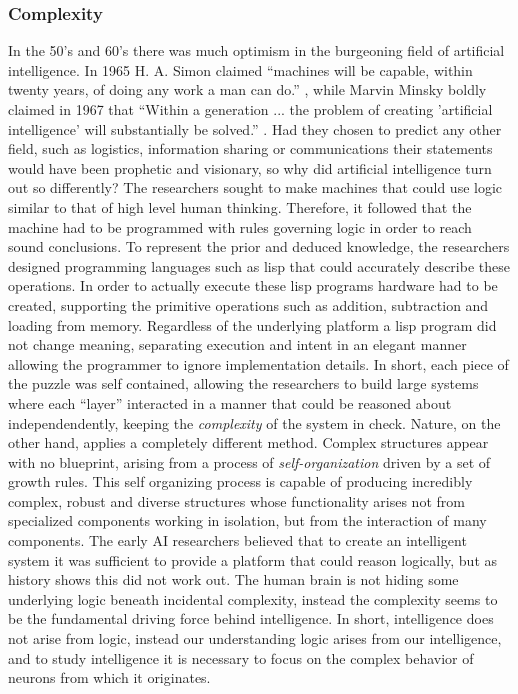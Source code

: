 \subsubsection{Complexity}
In the 50's and 60's there was much optimism in the burgeoning field of
artificial intelligence. In 1965 H. A. Simon claimed ``machines will be capable,
within twenty years, of doing any work a man can
do.''\cite{DREYFUS92} , while Marvin Minsky boldly claimed in 1967
that ``Within a generation ... the problem of creating 'artificial intelligence'
will substantially be solved.'' \cite{DREYFUS92}.
Had they chosen to predict any other field, such as logistics, information
sharing or communications their statements would have been prophetic and
visionary, so why did artificial intelligence turn out so differently?
%
The researchers sought to make machines that could use logic similar to that of
high level human thinking.
%
Therefore, it followed that the machine had to be programmed with rules
governing logic in order to reach sound conclusions.
%
To represent the prior and deduced knowledge, the researchers designed
programming languages such as lisp that could accurately describe these
operations.
%
In order to actually execute these lisp programs hardware had to be created,
supporting the primitive operations such as addition, subtraction and loading
from memory.
%
Regardless of the underlying platform a lisp program did not change meaning,
separating execution and intent in an elegant manner allowing the programmer to
ignore implementation details.
%
In short, each piece of the puzzle was self contained, allowing the researchers 
to build large systems where each ``layer'' interacted in a manner that could be
reasoned about independendently, keeping the \emph{complexity} of the system in
check.
%
Nature, on the other hand, applies a completely different method.
Complex structures appear with no blueprint, arising from a process of
\emph{self-organization} driven by a set of growth rules.
%
This self organizing process is capable of producing incredibly complex, robust
and diverse structures whose functionality arises not from specialized
components working in isolation, but from the interaction of many components.
%
The early AI researchers believed that to create an intelligent system it was
sufficient to provide a platform that could reason logically, but as history
shows this did not work out.
%
The human brain is not hiding some underlying logic beneath incidental
complexity, instead the complexity seems to be the fundamental driving force
behind intelligence.
In short, intelligence does not arise from logic, instead our understanding
logic arises from our intelligence, and to study intelligence it is necessary to
focus on the complex behavior of neurons from which it originates.
